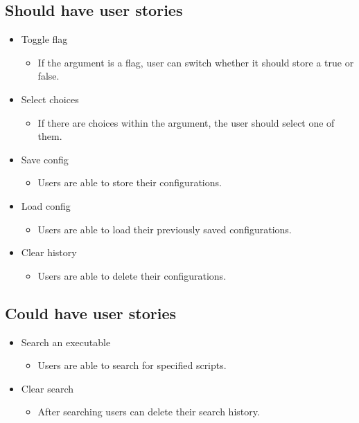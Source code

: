 \documentclass{article}
\begin{document}
\subsection{Should have user stories}
\begin{itemize}
    \item Toggle flag
    \begin{itemize}
        \item If the argument is a flag, user can switch whether it should store a true or false.
    \end{itemize}
    \item Select choices
    \begin{itemize}
        \item If there are choices within the argument, the user should select one of them.
    \end{itemize}
    \item Save config
     \begin{itemize}
         \item Users are able to store their configurations.
     \end{itemize}
     \item Load config
     \begin{itemize}
         \item Users are able to load their previously saved configurations.
     \end{itemize}
     \item Clear history
     \begin{itemize}
         \item Users are able to delete their configurations.
     \end{itemize}
\end{itemize}

\subsection{Could have user stories}
\begin{itemize}
    \item Search an executable
    \begin{itemize}
        \item Users are able to search for specified scripts.
    \end{itemize}
    \item Clear search
    \begin{itemize}
        \item After searching users can delete their search history.
    \end{itemize}
\end{itemize}
\end{document}
